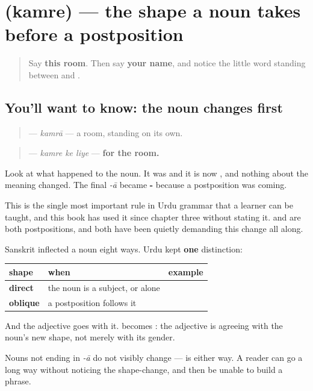 \section[\texorpdfstring{\ur{کمرے} (kamre)}{کمرے (kamre)}]{ (kamre) — the shape a noun takes before a postposition}

\label{lesson:UR-C23-oblique}



\begin{quote}
Say \textbf{this room}. Then say \textbf{your name}, and notice the little word standing between \textbf{} and \textbf{}.
\end{quote}

\subsection*{You'll want to know: the noun changes first}
\begin{quote}
\textbf{} — \emph{kamrā} — a room, standing on its own.
\end{quote}

\begin{quote}
\textbf{  } — \emph{kamre ke liye} — \textbf{for the room.}
\end{quote}

Look at what happened to the noun. It was \textbf{} and it is now \textbf{}, and nothing about the meaning changed. The final \emph{-ā} became \textbf{-} because a postposition was coming.

This is the single most important rule in Urdu grammar that a learner can be taught, and this book has used it since chapter three without stating it. \textbf{  } and \textbf{ } are both postpositions, and both have been quietly demanding this change all along.

\begin{grammarlens}[title={Grammar Lens: two shapes, and only two}]
Sanskrit inflected a noun eight ways. Urdu kept \textbf{one} distinction:

\noindent
\begin{tabularx}{\linewidth}{@{}>{\raggedright\arraybackslash}X>{\raggedright\arraybackslash}X>{\raggedright\arraybackslash}X@{}}
\toprule
\textbf{shape} & \textbf{when} & \textbf{example} \\
\midrule
\textbf{direct} & the noun is a subject, or alone & \textbf{\ur{کمرہ}} \\
\textbf{oblique} & a postposition follows it & \textbf{\ur{کمرے}} \\
\bottomrule
\end{tabularx}

And the adjective goes with it. \textbf{ } becomes \textbf{ }: the adjective is agreeing with the noun's new shape, not merely with its gender.

Nouns not ending in \emph{-ā} do not visibly change — \textbf{} is \textbf{} either way. A reader can go a long way without noticing the shape-change, and then be unable to build a phrase.
\end{grammarlens}

